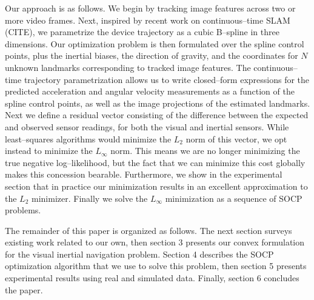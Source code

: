 Our approach is as follows. We begin by tracking image features across two or more video frames. Next, inspired by recent work on continuous--time SLAM (CITE), we parametrize the device trajectory as a cubic B--spline in three dimensions. Our optimization problem is then formulated over the spline control points, plus the inertial biases, the direction of gravity, and the coordinates for $N$ unknown landmarks corresponding to tracked image features. The continuous--time trajectory parametrization allows us to write closed--form expressions for the predicted acceleration and angular velocity measurements as a function of the spline control points, as well as the image projections of the estimated landmarks. Next we define a residual vector consisting of the difference between the expected and observed sensor readings, for both the visual and inertial sensors. While least--squares algorithms would minimize the $L_2$ norm of this vector, we opt instead to minimize the $L_\infty$ norm. This means we are no longer minimizing the true negative log--likelihood, but the fact that we can minimize this cost globally makes this concession bearable. Furthermore, we show in the experimental section that in practice our minimization results in an excellent approximation to the $L_2$ minimizer. Finally we solve the $L_\infty$ minimization as a sequence of SOCP problems.

The remainder of this paper is organized as follows. The next section surveys existing work related to our own, then section 3 presents our convex formulation for the visual inertial navigation problem. Section 4 describes the SOCP optimization algorithm that we use to solve this problem, then section 5 presents experimental results using real and simulated data. Finally, section 6 concludes the paper.

